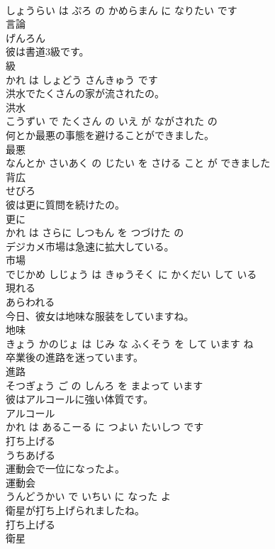 \documentclass[8pt]{extreport}
\begin{document}
\begin{CJK}{UTF8}{min}
\\	しょうらい は ぷろ の かめらまん に なりたい です			
\\	言論	
\\	げんろん		
\\	彼は書道3級です。	
\\	級 
\\	かれ は しょどう さんきゅう です			
\\	洪水でたくさんの家が流されたの。	
\\	洪水 
\\	こうずい で たくさん の いえ が ながされた の			
\\	何とか最悪の事態を避けることができました。	
\\	最悪 
\\	なんとか さいあく の じたい を さける こと が できました			
\\	背広	
\\	せびろ		
\\	彼は更に質問を続けたの。	
\\	更に 
\\	かれ は さらに しつもん を つづけた の			
\\	デジカメ市場は急速に拡大している。	
\\	市場 
\\	でじかめ しじょう は きゅうそく に かくだい して いる			
\\	現れる	
\\	あらわれる		
\\	今日、彼女は地味な服装をしていますね。	
\\	地味 
\\	きょう かのじょ は じみ な ふくそう を して います ね			
\\	卒業後の進路を迷っています。	
\\	進路 
\\	そつぎょう ご の しんろ を まよって います			
\\	彼はアルコールに強い体質です。	
\\	アルコール 
\\	かれ は あるこーる に つよい たいしつ です			
\\	打ち上げる	
\\	うちあげる		
\\	運動会で一位になったよ。	
\\	運動会 
\\	うんどうかい で いちい に なった よ			
\\	衛星が打ち上げられましたね。	
\\	打ち上げる 
\\	衛星 

\end{CJK}
\end{document}
